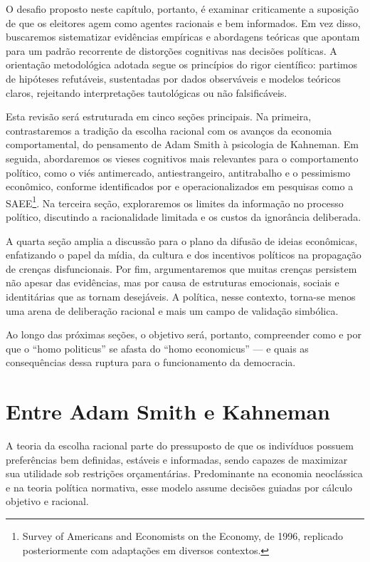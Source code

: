 O desafio proposto neste capítulo, portanto, é examinar criticamente a suposição de que os eleitores agem como agentes racionais e bem informados. Em vez disso, buscaremos sistematizar evidências empíricas e abordagens teóricas que apontam para um padrão recorrente de distorções cognitivas nas decisões políticas. A orientação metodológica adotada segue os princípios do rigor científico: partimos de hipóteses refutáveis, sustentadas por dados observáveis e modelos teóricos claros, rejeitando interpretações tautológicas ou não falsificáveis.

Esta revisão será estruturada em cinco seções principais. Na primeira, contrastaremos a tradição da escolha racional com os avanços da economia comportamental, do pensamento de Adam Smith à psicologia de Kahneman. Em seguida, abordaremos os vieses cognitivos mais relevantes para o comportamento político, como o viés antimercado, antiestrangeiro, antitrabalho e o pessimismo econômico, conforme identificados por \cite{Systematically_Biased_Beliefs_about_Economics} e operacionalizados em pesquisas como a SAEE\footnote{Survey of Americans and Economists on the Economy, de 1996, replicado posteriormente com adaptações em diversos contextos.}. Na terceira seção, exploraremos os limites da informação no processo político, discutindo a racionalidade limitada e os custos da ignorância deliberada.

A quarta seção amplia a discussão para o plano da difusão de ideias econômicas, enfatizando o papel da mídia, da cultura e dos incentivos políticos na propagação de crenças disfuncionais. Por fim, argumentaremos que muitas crenças persistem não apesar das evidências, mas por causa de estruturas emocionais, sociais e identitárias que as tornam desejáveis. A política, nesse contexto, torna-se menos uma arena de deliberação racional e mais um campo de validação simbólica.

Ao longo das próximas seções, o objetivo será, portanto, compreender como e por que o ``homo politicus'' se afasta do ``homo economicus'' — e quais as consequências dessa ruptura para o funcionamento da democracia.

\section{Entre Adam Smith e Kahneman} %

A teoria da escolha racional parte do pressuposto de que os indivíduos possuem preferências bem definidas, estáveis e informadas, sendo capazes de maximizar sua utilidade sob restrições orçamentárias. Predominante na economia neoclássica e na teoria política normativa, esse modelo assume decisões guiadas por cálculo objetivo e racional.


